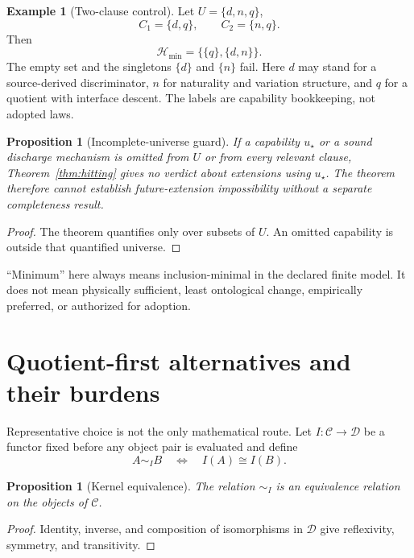 \documentclass[11pt]{article}
\newtheorem{proposition}[theorem]{Proposition}
\theoremstyle{definition}
\newtheorem{example}[theorem]{Example}
\newcommand{\C}{\mathcal C}
\newcommand{\D}{\mathcal D}
\newcommand{\EqI}{\mathrel{\sim_I}}
\begin{document}
\begin{example}[Two-clause control]
Let \(U=\{d,n,q\}\),
\[
  C_1=\{d,q\},\qquad C_2=\{n,q\}.
\]
Then
\[
  \mathcal H_{\min}=\bigl\{\{q\},\{d,n\}\bigr\}.
\]
The empty set and the singletons \(\{d\}\) and \(\{n\}\) fail.  Here \(d\)
may stand for a source-derived discriminator, \(n\) for naturality and
variation structure, and \(q\) for a quotient with interface descent.  The
labels are capability bookkeeping, not adopted laws.
\end{example}

\begin{proposition}[Incomplete-universe guard]
If a capability \(u_\star\) or a sound discharge mechanism is omitted from
\(U\) or from every relevant clause, Theorem~\ref{thm:hitting} gives no
verdict about extensions using \(u_\star\).  The theorem therefore cannot
establish future-extension impossibility without a separate completeness
result.
\end{proposition}

\begin{proof}
The theorem quantifies only over subsets of \(U\).  An omitted capability is
outside that quantified universe.
\end{proof}

``Minimum'' here always means inclusion-minimal in the declared finite model.
It does not mean physically sufficient, least ontological change, empirically
preferred, or authorized for adoption.

\section{Quotient-first alternatives and their burdens}

Representative choice is not the only mathematical route.  Let
\(I:\C\to\D\) be a functor fixed before any object pair is evaluated and
define
\[
  A\EqI B\quad\Longleftrightarrow\quad I(A)\cong I(B).
\]

\begin{proposition}[Kernel equivalence]
The relation \(\EqI\) is an equivalence relation on the objects of \(\C\).
\end{proposition}

\begin{proof}
Identity, inverse, and composition of isomorphisms in \(\D\) give
reflexivity, symmetry, and transitivity.
\end{proof}
\end{document}
